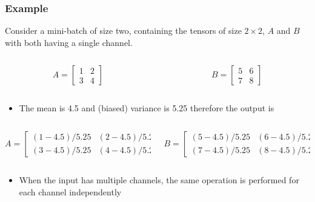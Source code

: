 \documentclass{beamer}
\begin{document}
\begin{frame}
    \frametitle{Example}
Consider a mini-batch of size two, containing the tensors of size $2\times 2$, $A$ and $B$ with both having a single channel.


\begin{columns}
    
    \begin{column}{0.5\textwidth}
        \[
    A=\begin{bmatrix}
        1 &2 \\
        3 & 4
    \end{bmatrix}    
    \]
    \end{column}
  \begin{column}{0.5\textwidth}
      \[
        B=\begin{bmatrix}
         5 &6 \\
         7 & 8
        \end{bmatrix}    
      \]
  \end{column}

\end{columns}
\begin{itemize}
    \item The mean is 4.5 and (biased) variance is 5.25 therefore the output is
\end{itemize}
 
\begin{columns}
    
    \begin{column}{0.45\textwidth}
        \[
    A=\left[\begin{smallmatrix}
        (1-4.5)/5.25 &(2-4.5)/5.25 \\
        (3-4.5)/5.25 & (4-4.5)/5.25
    \end{smallmatrix}    \right]
    \]
    \end{column}
  \begin{column}{0.45\textwidth}
    \[ 
        B=\left[\begin{smallmatrix}
         (5-4.5)/5.25 & (6-4.5)/5.25 \\
         (7-4.5)/5.25 & (8-4.5)/5.25
        \end{smallmatrix}\right]    
      \]
     
  \end{column}
  
\end{columns}
\begin{itemize}
    \item When the input has multiple channels, the same operation is performed for each channel independently
    \end{itemize}
\end{frame}
\end{document}
